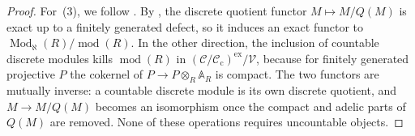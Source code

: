 \begin{proof}
For~(3), we follow \cite[Proposition 6.8 and Corollary 6.9]{BHRAdeles}.
By \cite[Lemma 2.18]{BHRAdeles}, the discrete quotient functor $M\mapsto M/Q(M)$ is exact up to a finitely generated defect, so it induces an exact functor to $\operatorname{Mod}_\aleph(R)/\operatorname{mod}(R)$.
In the other direction, the inclusion of countable discrete modules kills $\operatorname{mod}(R)$ in $(\mathcal C/\mathcal C_{\mathrm c})^{\mathrm{ex}}/\mathcal V$, because for finitely generated projective $P$ the cokernel of $P\to P\otimes_R\mathbb A_R$ is compact.
The two functors are mutually inverse: a countable discrete module is its own discrete quotient, and $M\to M/Q(M)$ becomes an isomorphism once the compact and adelic parts of $Q(M)$ are removed.
None of these operations requires uncountable objects.
\end{proof}

